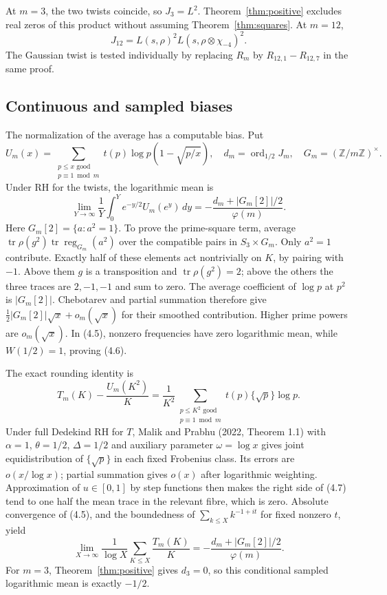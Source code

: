 \documentclass[11pt]{article}
\newcommand{\Z}{\mathbb Z}
\newcommand{\tr}{\operatorname{tr}}
\newcommand{\ord}{\operatorname{ord}}
\begin{document}
At $m=3$, the two twists coincide, so $J_3=L^2$. Theorem~\ref{thm:positive} excludes real zeros of this product without assuming Theorem~\ref{thm:squares}. At $m=12$,
\[
 J_{12}=L(s,\rho)^2L(s,\rho\otimes\chi_{-4})^2.
\]
The Gaussian twist is tested individually by replacing $R_m$ by $R_{12,1}-R_{12,7}$ in the same proof.

\subsection{Continuous and sampled biases}
The normalization of the average has a computable bias. Put
\[
 U_m(x)=\sum_{\substack{p\le x\text{ good}\\p\equiv1\bmod m}}
     t(p)\log p(1-\sqrt{p/x}),\quad
 d_m=\ord_{1/2}J_m,
 \quad G_m=(\Z/m\Z)^\times.
\]
Under RH for the twists, the logarithmic mean is
\[
 \lim_{Y\to\infty}\frac1Y\int_0^Y e^{-y/2}U_m(e^y)\,dy
  =-\frac{d_m+|G_m[2]|/2}{\varphi(m)}.
 \tag{4.6}
\]
Here $G_m[2]=\{a:a^2=1\}$. To prove the prime-square term, average
$\tr\rho(g^2)\tr\operatorname{reg}_{G_m}(a^2)$ over the compatible pairs in $S_3\times G_m$. Only $a^2=1$ contribute. Exactly half of these elements act nontrivially on $K$, by pairing with $-1$. Above them $g$ is a transposition and $\tr\rho(g^2)=2$; above the others the three traces are $2,-1,-1$ and sum to zero. The average coefficient of $\log p$ at $p^2$ is $|G_m[2]|$. Chebotarev and partial summation therefore give $\tfrac12|G_m[2]|\sqrt x+o_m(\sqrt x)$ for their smoothed contribution. Higher prime powers are $o_m(\sqrt x)$. In (4.5), nonzero frequencies have zero logarithmic mean, while $W(1/2)=1$, proving (4.6).

The exact rounding identity is
\[
 T_m(K)-\frac{U_m(K^2)}K
 =\frac1{K^2}\sum_{\substack{p\le K^2\text{ good}\\p\equiv1\bmod m}}
                  t(p)\{\sqrt p\}\log p.
 \tag{4.7}
\]
Under full Dedekind RH for $T$, Malik and Prabhu (2022, Theorem 1.1) with $\alpha=1$, $\theta=1/2$, $\Delta=1/2$ and auxiliary parameter $\omega=\log x$ gives joint equidistribution of $\{\sqrt p\}$ in each fixed Frobenius class. Its errors are $o(x/\log x)$; partial summation gives $o(x)$ after logarithmic weighting. Approximation of $u\in[0,1]$ by step functions then makes the right side of (4.7) tend to one half the mean trace in the relevant fibre, which is zero. Absolute convergence of (4.5), and the boundedness of $\sum_{k\le X}k^{-1+it}$ for fixed nonzero $t$, yield
\[
 \lim_{X\to\infty}\frac1{\log X}\sum_{K\le X}\frac{T_m(K)}K
       =-\frac{d_m+|G_m[2]|/2}{\varphi(m)}.
 \tag{4.8}
\]
For $m=3$, Theorem~\ref{thm:positive} gives $d_3=0$, so this conditional sampled logarithmic mean is exactly $-1/2$.
\end{document}
